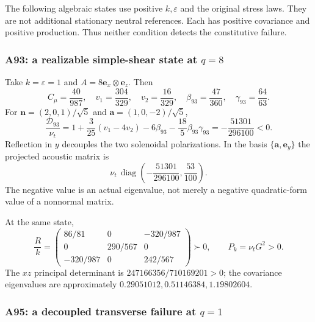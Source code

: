 \documentclass[11pt,a4paper]{article}
\numberwithin{equation}{section}
\newcommand{\eps}{\varepsilon}
\newcommand{\nut}{\nu_t}
\DeclareMathOperator{\diag}{diag}
\begin{document}
The following algebraic states use positive $k,\eps$ and the original
stress laws. They are not additional stationary neutral references.
Each has positive covariance and positive production. Thus neither
condition detects the constitutive failure.

\subsubsection{A93: a realizable simple-shear state at \texorpdfstring{$q=8$}{q=8}}

Take $k=\eps=1$ and $A=8\boldsymbol e_x\otimes\boldsymbol e_z$.
Then
\[
 C_\mu=\frac{40}{987},\quad
 v_1=\frac{304}{329},\quad v_2=\frac{16}{329},\quad
 \beta_{93}=\frac{47}{360},\quad\gamma_{93}=\frac{64}{63}.
\]
For
$\boldsymbol n=(2,0,1)/\sqrt5$ and
$\boldsymbol a=(1,0,-2)/\sqrt5$,
\begin{equation}
 \frac{\mathcal D_{93}}{\nut}
 =1+\frac3{25}(v_1-4v_2)-6\beta_{93}
             -\frac{18}{5}\beta_{93}\gamma_{93}
 =-\frac{51301}{296100}<0.
 \label{st:a93-negative}
\end{equation}
Reflection in $y$ decouples the two solenoidal polarizations.
In the basis $\{\boldsymbol a,\boldsymbol e_y\}$ the projected
acoustic matrix is
\[
 \nut\,\diag\left(-\frac{51301}{296100},\frac{53}{100}\right).
\]
The negative value is an actual eigenvalue, not merely a negative
quadratic-form value of a nonnormal matrix.

At the same state,
\begin{equation}
 \frac Rk=
 \begin{pmatrix}
 86/81&0&-320/987\\
 0&290/567&0\\
 -320/987&0&242/567
 \end{pmatrix}\succ0,\qquad P_k=\nut G^2>0.
 \label{st:a93-failure-covariance}
\end{equation}
The $xz$ principal determinant is
$247166356/710169201>0$; the covariance eigenvalues are approximately
$0.29051012,0.51146384,1.19802604$.

\subsubsection{A95: a decoupled transverse failure at \texorpdfstring{$q=1$}{q=1}}
\end{document}
